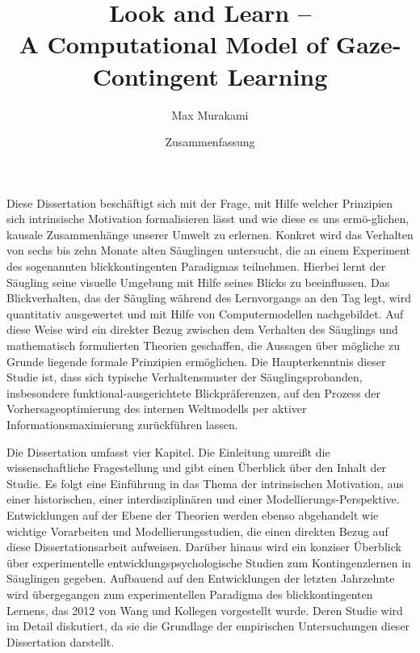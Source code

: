 \documentclass[a4paper]{article}
\begin{document}



\title{Look and Learn --\\A Computational Model of Gaze-Contingent Learning}
\author{Max Murakami}
\date{Zusammenfassung}

\maketitle

Diese Dissertation besch\"aftigt sich mit der Frage, mit Hilfe welcher Prinzipien sich intrinsische Motivation formalisieren l\"asst und wie diese es uns erm\"o-glichen, kausale Zusammenh\"ange unserer Umwelt zu erlernen. Konkret wird das Verhalten von sechs bis zehn Monate alten S\"auglingen untersucht, die an einem Experiment des sogenannten blickkontingenten Paradigmas teilnehmen. Hierbei lernt der S\"augling seine visuelle Umgebung mit Hilfe seines Blicks zu beeinflussen. Das Blickverhalten, das der S\"augling w\"ahrend des Lernvorgangs an den Tag legt, wird quantitativ ausgewertet und mit Hilfe von Computermodellen nachgebildet. Auf diese Weise wird ein direkter Bezug zwischen dem Verhalten des S\"auglings und mathematisch formulierten Theorien geschaffen, die Aussagen \"uber m\"ogliche zu Grunde liegende formale Prinzipien erm\"oglichen. Die Haupterkenntnis dieser Studie ist, dass sich typische Verhaltensmuster der S\"auglingsprobanden, insbesondere funktional-ausgerichtete Blickpr\"aferenzen, auf den Prozess der Vorhersageoptimierung des internen Weltmodells per aktiver Informationsmaximierung zur\"uckf\"uhren lassen.

Die Dissertation umfasst vier Kapitel. Die Einleitung umrei\ss t die wissenschaftliche Fragestellung und gibt einen \"Uberblick \"uber den Inhalt der Studie. Es folgt eine Einf\"uhrung in das Thema der intrinsischen Motivation, aus einer historischen, einer interdisziplin\"aren und einer Modellierungs-Perspektive. Entwicklungen auf der Ebene der Theorien werden ebenso abgehandelt wie wichtige Vorarbeiten und Modellierungsstudien, die einen direkten Bezug auf diese Dissertationsarbeit aufweisen. Dar\"uber hinaus wird ein konziser \"Uberblick \"uber experimentelle entwicklungspsychologische Studien zum Kontingenzlernen in S\"auglingen gegeben. Aufbauend auf den Entwicklungen der letzten Jahrzehnte wird \"ubergegangen zum experimentellen Paradigma des blickkontingenten Lernens, das 2012 von Wang und Kollegen vorgestellt wurde. Deren Studie wird im Detail diskutiert, da sie die Grundlage der empirischen Untersuchungen dieser Dissertation darstellt.
\end{document}
